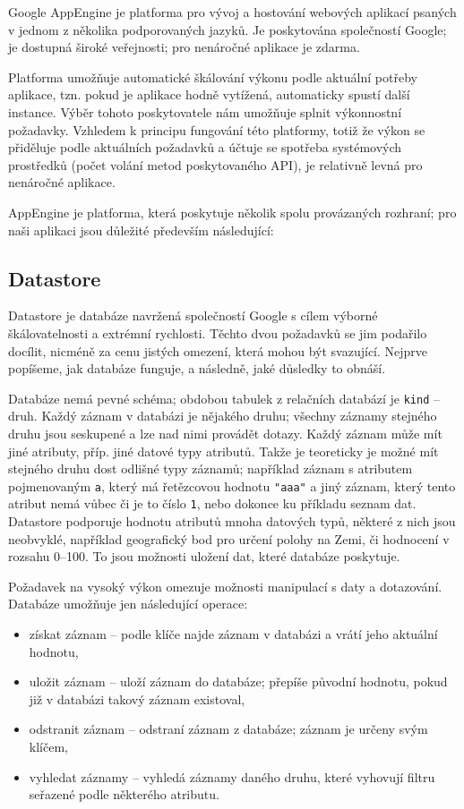 Google AppEngine je platforma pro vývoj a hostování webových aplikací psaných v jednom z několika podporovaných jazyků.
Je poskytována společností Google; je dostupná široké veřejnosti; pro nenáročné aplikace je zdarma.

Platforma umožňuje automatické škálování výkonu podle aktuální potřeby aplikace, tzn. pokud je aplikace hodně vytížená, automaticky spustí další instance.
Výběr tohoto poskytovatele nám umožňuje splnit výkonnostní požadavky.
Vzhledem k principu fungování této platformy, totiž že výkon se přiděluje podle aktuálních požadavků a účtuje se spotřeba systémových prostředků (počet volání metod poskytovaného API), je relativně levná pro nenáročné aplikace.

AppEngine je platforma, která poskytuje několik spolu provázaných rozhraní; pro naši aplikaci jsou důležité především následující:

\subsection{Datastore}
Datastore je databáze navržená společností Google s cílem výborné škálovatelnosti a extrémní rychlosti.
Těchto dvou požadavků se jim podařilo docílit, nicméně za cenu jistých omezení, která mohou být svazující.
Nejprve popíšeme, jak databáze funguje, a následně, jaké důsledky to obnáší.

Databáze nemá pevné schéma; obdobou tabulek z relačních databází je \verb|kind| -- druh.
Každý záznam v databázi je nějakého druhu; všechny záznamy stejného druhu jsou seskupené a lze nad nimi provádět dotazy.
Každý záznam může mít jiné atributy, příp. jiné datové typy atributů.
Takže je teoreticky je možné mít stejného druhu dost odlišné typy záznamů; například záznam s atributem pojmenovaným \verb|a|, který má řetězcovou hodnotu \verb|"aaa"| a jiný záznam, který tento atribut nemá vůbec či je to číslo \verb|1|, nebo dokonce ku příkladu seznam dat.
Datastore podporuje hodnotu atributů mnoha datových typů, některé z nich jsou neobvyklé, například geografický bod pro určení polohy na Zemi, či hodnocení v rozsahu 0--100.
To jsou možnosti uložení dat, které databáze poskytuje.

Požadavek na vysoký výkon omezuje možnosti manipulací s daty a dotazování.
Databáze umožňuje jen následující operace:
\begin{itemize}
	\item získat záznam -- podle klíče najde záznam v databázi a vrátí jeho aktuální hodnotu,
	\item uložit záznam -- uloží záznam do databáze; přepíše původní hodnotu, pokud již v databázi takový záznam existoval,
	\item odstranit záznam -- odstraní záznam z databáze; záznam je určeny svým klíčem,
	\item vyhledat záznamy -- vyhledá záznamy daného druhu, které vyhovují filtru seřazené podle některého atributu.
\end{itemize}

